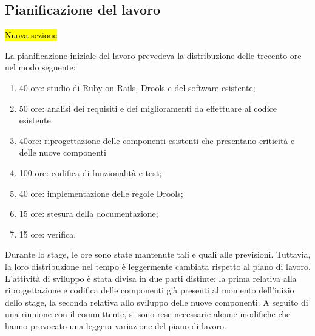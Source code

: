 \subsection{Pianificazione del lavoro}
\hl{Nuova sezione}

La pianificazione iniziale del lavoro prevedeva la distribuzione delle trecento ore nel modo seguente:
\begin{enumerate}
	\item	40 ore:     studio di Ruby on Rails, Drools e del software esistente;
	\item	50 ore:		analisi dei requisiti e dei miglioramenti da effettuare al codice esistente
	\item	40ore:		riprogettazione delle componenti esistenti che presentano criticità e delle nuove componenti
	\item	100 ore:     codifica di funzionalità e test;
	\item	40 ore:		implementazione delle regole Drools;
	\item 	15 ore:		 stesura della documentazione;
	\item	15 ore: 	verifica.
\end{enumerate}

%
%


Durante lo stage, le ore sono state mantenute tali e quali alle previsioni. Tuttavia, la loro distribuzione nel tempo è leggermente cambiata rispetto al piano di lavoro. \\
L'attività di sviluppo è stata divisa in due parti distinte:  la prima relativa alla riprogettazione e codifica delle componenti già presenti al momento dell'inizio dello stage, la seconda relativa allo sviluppo delle nuove componenti.
A seguito di una riunione con il committente, si sono rese necessarie alcune modifiche che hanno provocato una leggera variazione del piano di lavoro.\\

